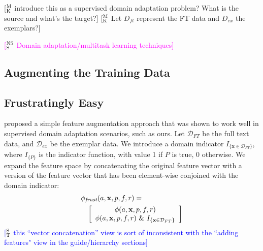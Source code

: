 \documentclass[11pt,a4paper]{article}
\newcommand{\indicator}[1]{I_{\{#1\}}} %
\newcommand{\ensuretext}[1]{#1}
\newcommand{\nssmarker}{\ensuretext{\textcolor{magenta}{\ensuremath{^{\textsc{NS}}_{\textsc{S}}}}}}
\newcommand{\mkmarker}{\ensuretext{\textcolor{mdgreen}{\ensuremath{^{\textsc{M}}_{\textsc{K}}}}}}
\newcommand{\stmarker}{\ensuretext{\textcolor{blue}{\ensuremath{^{\textsc{S}}_{\textsc{T}}}}}}
\newcommand{\arkcomment}[3]{\ensuretext{\textcolor{#3}{[#1 #2]}}}
\newcommand{\nss}[1]{\arkcomment{\nssmarker}{#1}{magenta}}
\newcommand{\mk}[1]{\arkcomment{\mkmarker}{#1}{mdgreen}}
\newcommand{\st}[1]{\arkcomment{\stmarker}{#1}{blue}}
\begin{document}
\mk{introduce this as a supervised domain adaptation problem? What is the source and what's the target?}
\mk{Let $D_{ft}$ represent the FT data and $D_{ex}$ the exemplars?}


\nss{Domain adaptation/multitask learning techniques}

\subsection{Augmenting the Training Data}
\label{sec:aug_data}

\subsection{Frustratingly Easy}
\label{sec:frust}
 proposed a simple feature augmentation approach that was shown to work well in supervised domain adaptation scenarios, 
such as ours.
Let $\mathcal{D}_{FT}$ be the full text data, and $\mathcal{D}_{ex}$ be the exemplar data.
We %
introduce a domain indicator %
$\indicator{\mathbf{x} \in \mathcal{D}_{FT}}$,
where $\indicator{P}$ is the indicator function, with value 1 if $P$ is true, 0 otherwise.
We expand the feature space by concatenating the original feature vector with a version of the feature vector that has been element-wise conjoined with the domain indicator:
\begin{align*}
\lefteqn{
\phi_{\textit{frust}}(a, \mathbf{x}, p, f, r) =
} \\
&&
\left[\begin{array}{c}
\phi(a, \mathbf{x}, p, f, r) \\
\phi(a, \mathbf{x}, p, f, r) \text{ \& } \indicator{\mathbf{x} \in \mathcal{D}_{FT}}%
\end{array}
\right]
\end{align*}
\st{this ``vector concatenation'' view is sort of inconsistent with the ``adding features" view in the guide/hierarchy sections}
\end{document}
